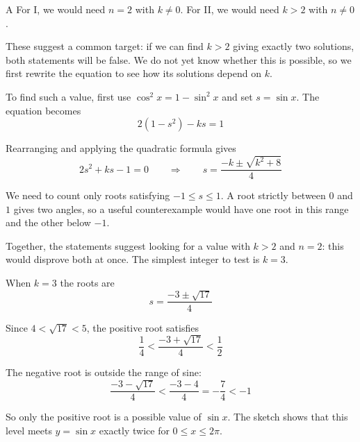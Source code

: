 \documentclass[11pt,a4paper]{article}
\begin{document}
\begin{enumerate}[label=\textbf{\arabic*.},leftmargin=*,itemsep=0pt,start=9]
\begin{djsSolution}{A}
For I, we would need $n=2$ with $k\ne0$. For II, we would need $k>2$ with $n\ne0$.

These suggest a common target: if we can find $k>2$ giving exactly two solutions, both statements will be false. We do not yet know whether this is possible, so we first rewrite the equation to see how its solutions depend on $k$.
 
To find such a value, first use $\cos^2x=1-\sin^2x$ and set $s=\sin x$. The equation becomes
\[
2(1-s^2)-ks=1
\]

Rearranging and applying the quadratic formula gives
\[
2s^2+ks-1=0
\qquad\Longrightarrow\qquad
s=\frac{-k\pm\sqrt{k^2+8}}4
\]

We need to count only roots satisfying $-1\le s\le1$. A root strictly between $0$ and $1$ gives two angles, so a useful counterexample would have one root in this range and the other below $-1$.

Together, the statements suggest looking for a value with $k>2$ and $n=2$: this would disprove both at once. The simplest integer to test is $k=3$.

When $k=3$ the roots are
\[
s=\frac{-3\pm\sqrt{17}}4
\]

Since $4<\sqrt{17}<5$, the positive root satisfies
\[
\frac14<\frac{-3+\sqrt{17}}4<\frac12
\]

The negative root is outside the range of sine:
\[
\frac{-3-\sqrt{17}}4<\frac{-3-4}{4}=-\frac74<-1
\]

So only the positive root is a possible value of $\sin x$. The sketch shows that this level meets $y=\sin x$ exactly twice for $0\le x\le2\pi$.

\begin{djsSolutionFigure}
\end{djsSolutionFigure}


\end{djsSolution}
\end{enumerate}
\end{document}

